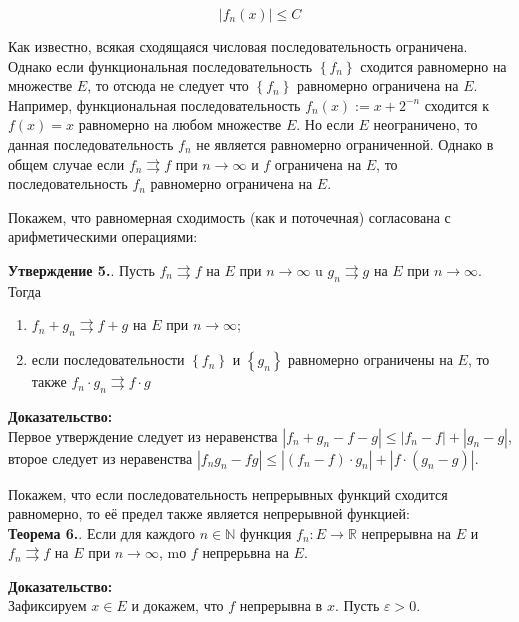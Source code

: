 \documentclass[a4paper,12pt]{article} %
\begin{document}
	$$
	\left|f_{n}(x)\right| \leq C
	$$
	
	Как известно, всякая сходящаяся числовая последовательность ограничена. Однако если функциональная последовательность $\left\{f_{n}\right\}$ сходится равномерно на множестве $E$, то отсюда не следует что $\left\{f_{n}\right\}$ равномерно ограничена на $E$. Например, функциональная последовательность $f_{n}(x):=x+2^{-n}$ сходится к $f(x)=x$ равномерно на любом множестве $E$. Но если $E$ неограничено, то данная последовательность $f_{n}$ не является равномерно ограниченной. Однако в общем случае если $f_{n} \rightrightarrows f$ при $n \rightarrow \infty$ и $f$ ограничена на $E$, то последовательность $f_{n}$ равномерно ограничена на $E$.
	
	Покажем, что равномерная сходимость (как и поточечная) согласована с арифметическими операциями:
	
	\textbf{Утверждение 5.}. Пусть $f_{n} \rightrightarrows f$ на $E$ при $n \rightarrow \infty$ u $g_{n} \rightrightarrows g$ на $E$ при $n \rightarrow \infty$. Тогда
	
	\begin{enumerate}
		\item $f_{n}+g_{n} \rightrightarrows f+g$ на $E$ при $n \rightarrow \infty$;
	
		\item если последовательности $\left\{f_{n}\right\}$ и $\left\{g_{n}\right\}$ равномерно ограничены на $E$, то также $f_{n} \cdot g_{n} \rightrightarrows f \cdot g$
	
	\end{enumerate}
	
	\textbf{Доказательство:\\}
	Первое утверждение следует из неравенства $\left|f_{n}+g_{n}-f-g\right| \leq\left|f_{n}-f\right|+\left|g_{n}-g\right|$, второе следует из неравенства $\left|f_{n} g_{n}-f g\right| \leq\left|\left(f_{n}-f\right) \cdot g_{n}\right|+\left|f \cdot\left(g_{n}-g\right)\right|$.
	
	Покажем, что если последовательность непрерывных функций сходится равномерно, то её предел также является непрерывной функцией:\\ \textbf{Теорема 6.}. Если для каждого $n \in \mathbb{N}$ функция $f_{n}: E \rightarrow \mathbb{R}$ непрерывна на $E$ и $f_{n} \rightrightarrows f$ на $E$ при $n \rightarrow \infty$, mо $f$ непрерьвна на $E$.
	
	\textbf{Доказательство:\\}
	Зафиксируем $x \in E$ и докажем, что $f$ непрерывна в $x$. Пусть $\varepsilon>0$.
	
\end{document}
